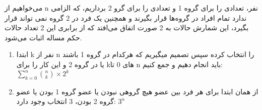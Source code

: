 \p
    می‌خواهیم از n نفر، تعدادی را برای گروه 1 و تعدادی را برای گرو 2 برداریم، که الزامی ندارد تمام افراد در گروه‌ها قرار بگیرند و همچنین یک فرد در 2 گروه نمی تواند قرار بگیرد، این شمارش حالات به 2 صورت اتفاق می‌افتد که از برابری این 2 تعداد حالات حکم مساله اثبات می‌شود.
    \begin{enumerate}
        \item 
        ابتدا k نفر از n را انتخاب کرده سپس تصمیم میگیریم که هرکدام در گروه 1 باشند یا در گروه 2 و این کار را برای k‌های 0 تا n باید انجام دهیم و جمع کنیم:
        \(\displaystyle\sum_{k=0}^{n} {\binom{n}{k}\times2^k}\)
        \item
        از همان ابتدا برای هر فرد بین عضو هیچ گروهی نبودن یا عضو گروه 1 بودن یا عضو گروه 2 بودن، 3 انتخاب وجود دارد:
        \(3^n\)
    \end{enumerate}